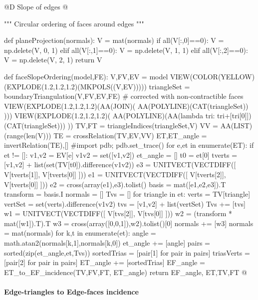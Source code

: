 \documentclass[11pt,oneside]{article}    %
\begin{document}
@D Slope of edges
@{""" Circular ordering of faces around edges """

def planeProjection(normals):
    V = mat(normals)
    if all(V[:,0]==0): V = np.delete(V, 0, 1)
    elif all(V[:,1]==0): V = np.delete(V, 1, 1)
    elif all(V[:,2]==0): V = np.delete(V, 2, 1)
    return V

def faceSlopeOrdering(model,FE):
    V,FV,EV = model
    VIEW(COLOR(YELLOW)(EXPLODE(1.2,1.2,1.2)(MKPOLS((V,EV)))))
    triangleSet = boundaryTriangulation(V,FV,EV,FE) # corrected with non-contractible faces
    VIEW(EXPLODE(1.2,1.2,1.2)(AA(JOIN)( AA(POLYLINE)(CAT(triangleSet)) )))
    VIEW(EXPLODE(1.2,1.2,1.2)( AA(POLYLINE)(AA(lambda tri: tri+[tri[0]])(CAT(triangleSet))) ))
    TV,FT = triangleIndices(triangleSet,V) 
    VV = AA(LIST)(range(len(V)))
    TE = crossRelation(TV,EV,VV)
    ET,ET_angle = invertRelation(TE),[]
    #import pdb; pdb.set_trace()
    for e,et in enumerate(ET):
        if et != []:
            v1,v2 = EV[e]
            v1v2 = set([v1,v2])
            et_angle = []
            t0 = et[0]
            tverts = [v1,v2] + list(set(TV[t0]).difference(v1v2))
            e3 = UNITVECT(VECTDIFF([ V[tverts[1]], V[tverts[0]] ]))
            e1 = UNITVECT(VECTDIFF([ V[tverts[2]], V[tverts[0]] ]))
            e2 = cross(array(e1),e3).tolist()
            basis = mat([e1,e2,e3]).T
            transform = basis.I
            normals = []
            Tvs = []
            for triangle in et:
                verts = TV[triangle]
                vertSet = set(verts).difference(v1v2)
                tvs = [v1,v2] + list(vertSet)
                Tvs += [tvs]
                w1 = UNITVECT(VECTDIFF([ V[tvs[2]], V[tvs[0]] ]))
                w2 = (transform * mat([w1]).T).T
                w3 = cross(array([0,0,1]),w2).tolist()[0]
                normals += [w3]
            normals = mat(normals)
            for k,t in enumerate(et):
                angle = math.atan2(normals[k,1],normals[k,0])
                et_angle += [angle]
            pairs = sorted(zip(et_angle,et,Tvs))
            sortedTrias = [pair[1] for pair in pairs]
            triasVerts = [pair[2] for pair in pairs]
            ET_angle += [sortedTrias]
    EF_angle = ET_to_EF_incidence(TV,FV,FT, ET_angle)
    return EF_angle, ET,TV,FT
@}



\paragraph{Edge-triangles to Edge-faces incidence}
\end{document}
